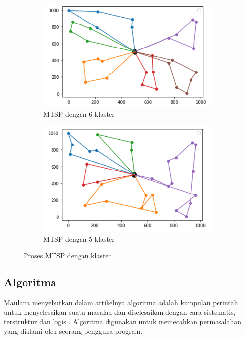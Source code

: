 \begin{figure}[H]
\centering
\begin{subfigure}[b]{0.48\textwidth}
\includegraphics[width=\textwidth]{Gambar/Picture1.png}
\caption{MTSP dengan 6 klaster}
\end{subfigure}
\hfill
\begin{subfigure}[b]{0.48\textwidth}
\includegraphics[width=\textwidth]{Gambar/Picture2.png}
\caption{MTSP dengan 5 klaster}
\end{subfigure}
\caption{Proses MTSP dengan klaster}
\label{fig:mtsp}
\end{figure}

\subsection{Algoritma}

Maulana menyebutkan dalam artikelnya algoritma adalah kumpulan perintah untuk menyelesaikan suatu masalah dan diselesaikan dengan cara sistematis, terstruktur dan logis \cite{maulana2017pembelajaran}. Algoritma digunakan untuk memecahkan permasalahan yang dialami oleh seorang pengguna program.

